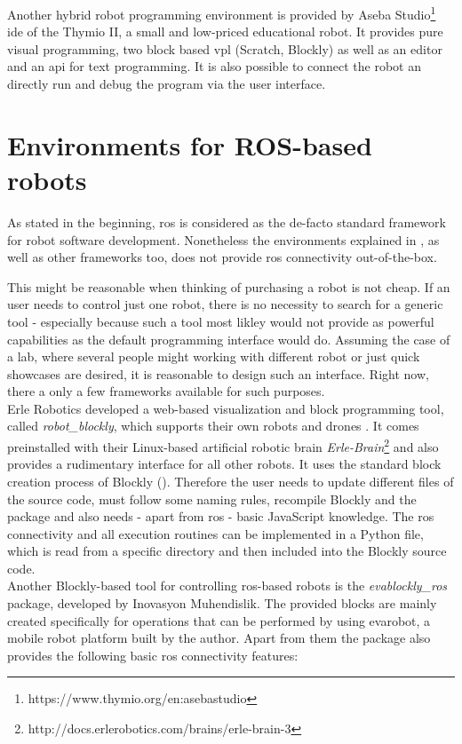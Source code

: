 Another hybrid robot programming environment is provided by Aseba Studio\footnote{https://www.thymio.org/en:asebastudio} \gls{ide} of the Thymio II, a small and low-priced educational robot. It provides pure visual programming, two block based \gls{vpl} (Scratch, Blockly) as well as an editor and an \gls{api} for text programming. It is also possible to connect the robot an directly run and debug the program via the user interface.

\section{Environments for ROS-based robots} \label{sec:RosEnvs}
As stated in the beginning, \gls{ros} is considered as the de-facto standard framework for robot software development. Nonetheless the environments explained in , as well as other frameworks too, does not provide \gls{ros} connectivity out-of-the-box.

This might be reasonable when thinking of purchasing a robot is not cheap. If an user needs to control just one robot, there is no necessity to search for a generic tool - especially because such a tool most likley would not provide as powerful capabilities as the default programming interface would do. Assuming the case of a lab, where several people might working with different robot or just quick showcases are desired, it is reasonable to design such an interface. Right now, there a only a few frameworks available for such purposes. \\

Erle Robotics developed a web-based visualization and block programming tool, called \textit{robot\_blockly}, which supports their own robots and drones \cite{erleblockly}. It comes preinstalled with their Linux-based artificial robotic brain \textit{Erle-Brain}\footnote{http://docs.erlerobotics.com/brains/erle-brain-3} and also provides a rudimentary interface for all other robots. It uses the standard block creation process of Blockly (). Therefore the user needs to update different files of the source code, must follow some naming rules, recompile Blockly and the package and also needs - apart from \gls{ros} - basic JavaScript knowledge. The \gls{ros} connectivity and all execution routines can be implemented in a Python file, which is read from a specific directory and then included into the Blockly source code. \\

Another Blockly-based tool for controlling \gls{ros}-based robots is the \textit{evablockly\_ros} package, developed by Inovasyon Muhendislik\cite{evablocklyros}. The provided blocks are mainly created specifically for operations that can be performed by using evarobot, a mobile robot platform built by the author. Apart from them the package also provides the following basic \gls{ros} connectivity features:

